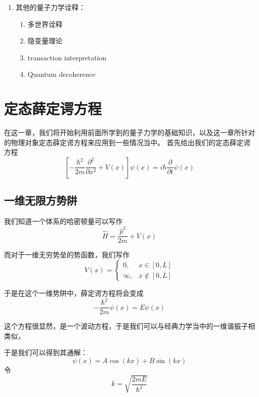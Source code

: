 \documentclass{article}
\newcommand{\expectation}[1]{\langle #1 \rangle}
\begin{document}
\begin{enumerate}
\begin{align*}
	      \end{align*}
	      最后我们将会得到埃伦费斯特所得到的表达式：
	      \[
		      \frac{d}{dt}\langle A(t)\rangle=
		      \frac{1}{i\hbar}\expectation{[A,\mathcal{H}]}+\frac{\partial}{\partial t}\expectation{A(t)}
	      \]
	      但是，如果$\expectation{A}$是与时间无关的，那么我们可以将埃伦费斯特定理写成这样的形式：
	      \[
		      \frac{d}{dt}\expectation{A(t)}=
		      \frac{1}{i\hbar}\expectation{[A,\mathcal{H}]}=0
	      \]
	      这将意味着一个守恒量$\expectation{[A,\mathcal{H}]}$
	\item 其他的量子力学诠释：
	      \begin{enumerate}
		      \item 多世界诠释
		      \item 隐变量理论
		      \item transaction interpretation
		      \item Quantum decoherence
	      \end{enumerate}
\end{enumerate}

\section{定态薛定谔方程}

在这一章，我们将开始利用前面所学到的量子力学的基础知识，以及这一章所针对的物理对象定态薛定谔方程来应用到一些情况当中。
首先给出我们的定态薛定谔方程
\[
	\left[-\frac{\hbar^2}{2m}\frac{\partial^2}{\partial x^2} + V(x)\right]\psi(x) = i\hbar\frac{\partial}{\partial t}\psi(x)
\]
\subsection{一维无限方势阱}
我们知道一个体系的哈密顿量可以写作
\[
	\hat{H}=\frac{\hat{p}^2}{2m}+V(x)
\]

而对于一维无穷势垒的势函数，我们写作
\[
	V(x)=\begin{cases}
		0,      & x\in[0,L]    \\
		\infty, & x\notin[0,L]
	\end{cases}
\]

于是在这个一维势阱中，薛定谔方程将会变成
\[
	-\frac{\hbar^2}{2m}\psi(x)=E\psi(x)
\]

这个方程很显然，是一个波动方程，于是我们可以与经典力学当中的一维谐振子相类似，

于是我们可以得到其通解：
\[
	\psi(x)=A\cos(kx)+B\sin(kx)
\]
令
\[
	k=\sqrt{\frac{2mE}{\hbar^2}}
\]
\end{document}
